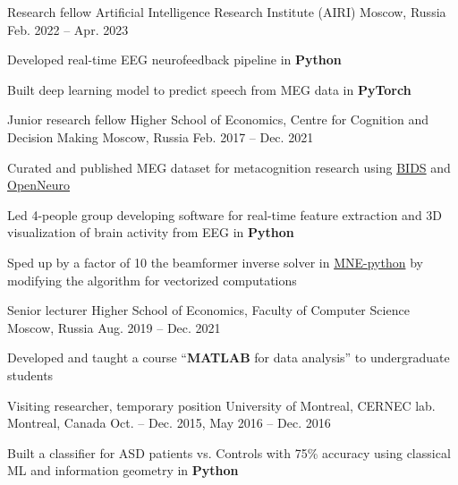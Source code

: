 
\begin{cventries}
  \cventry
    {Research fellow}
    {Artificial Intelligence Research Institute (AIRI)}
    {Moscow, Russia}
    {Feb. 2022 -- Apr. 2023}
    {
      \begin{cvitems}
      \item Developed real-time EEG neurofeedback pipeline in \textbf{Python}
      \item Built deep learning model to predict speech from MEG data in \textbf{PyTorch}
      \end{cvitems}
    }
  \cventry
    {Junior research fellow}
    {Higher School of Economics, Centre for Cognition and Decision Making}
    {Moscow, Russia}
    {Feb. 2017 -- Dec. 2021}
    {
      \begin{cvitems}
      \item{Curated and published MEG dataset for metacognition research using \href{https://bids.neuroimaging.io/}{BIDS} and \href{https://openneuro.org/}{OpenNeuro}}
      \item{Led 4-people group developing software for real-time feature extraction and 3D visualization of brain activity from EEG in \textbf{Python}}
        \item{Sped up by a factor of 10 the beamformer inverse solver in \href{https://github.com/mne-tools/mne-python}{MNE-python} by modifying the algorithm for vectorized computations}
      \end{cvitems}
    }
  \cventry
    {Senior lecturer}
    {Higher School of Economics, Faculty of Computer Science}
    {Moscow, Russia}
    {Aug. 2019 -- Dec. 2021}
    {
      \begin{cvitems}
      \item Developed and taught a course ``\textbf{MATLAB} for data analysis'' to undergraduate students
      \end{cvitems}
    }
  \cventry
    {Visiting researcher, temporary position}
    {University of Montreal, CERNEC lab.}
    {Montreal, Canada}
    {Oct. -- Dec. 2015, May 2016 -- Dec. 2016}
    {
      \begin{cvitems}
      \item{Built a classifier for ASD patients vs. Controls with 75\% accuracy using classical ML and information geometry in \textbf{Python}}

\end{cvitems}}
\end{cventries}
